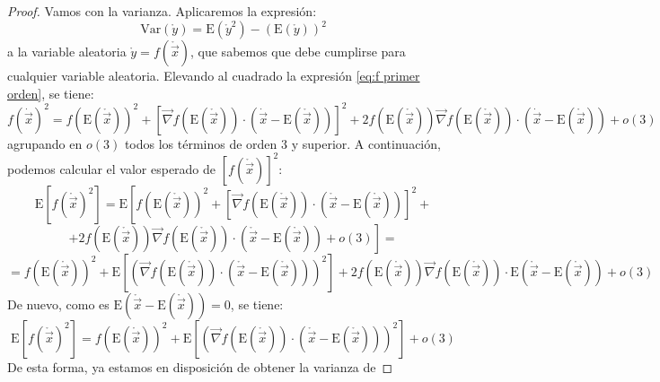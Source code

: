 \documentclass[11pt,a4paper,spanish]{article}
\numberwithin{equation}{section}
\numberwithin{table}{section}
\numberwithin{figure}{section}
\theoremstyle{definition}
\theoremstyle{remark}
\theoremstyle{definition}
\theoremstyle{remark}
\theoremstyle{plain}
\theoremstyle{plain}
\theoremstyle{plain}
\theoremstyle{plain}
\theoremstyle{plain}
\theoremstyle{plain}
\begin{document}
\begin{proof}
		Vamos con la varianza. Aplicaremos la expresión:
		\[
		\mathrm{Var}\left(\mathring{y}\right)=\mathrm{E}\left(\mathring{y}^{2}\right)-\left(\mathrm{E}\left(\mathring{y}\right)\right)^{2}
		\]
		a la variable aleatoria $\mathring{y}=f\left(\mathring{\vec{x}}\right)$,
		que sabemos que debe cumplirse para cualquier variable aleatoria.
		Elevando al cuadrado la expresión \vref{eq:f primer orden}, se tiene:
		\[
		f\left(\dot{\vec{x}}\right)^{2}=f\left(\mathrm{E}\left(\mathring{\vec{x}}\right)\right)^{2}+\left[\vec{\nabla}f\left(\mathrm{E}\left(\mathring{\vec{x}}\right)\right)\cdot\left(\dot{\vec{x}}-\mathrm{E}\left(\mathring{\vec{x}}\right)\right)\right]^{2}+2f\left(\mathrm{E}\left(\mathring{\vec{x}}\right)\right)\vec{\nabla}f\left(\mathrm{E}\left(\mathring{\vec{x}}\right)\right)\cdot\left(\dot{\vec{x}}-\mathrm{E}\left(\mathring{\vec{x}}\right)\right)+o\left(3\right)
		\]
		agrupando en $o\left(3\right)$ todos los términos de orden $3$ y
		superior. A continuación, podemos calcular el valor esperado de $\left[f\left(\mathring{\vec{x}}\right)\right]^{2}$:
		\[
		\mathrm{E}\left[f\left(\mathring{\vec{x}}\right)^{2}\right]=\mathrm{E}\left[f\left(\mathrm{E}\left(\mathring{\vec{x}}\right)\right)^{2}+\left[\vec{\nabla}f\left(\mathrm{E}\left(\mathring{\vec{x}}\right)\right)\cdot\left(\mathring{\vec{x}}-\mathrm{E}\left(\mathring{\vec{x}}\right)\right)\right]^{2}+\right.
		\]
		\[
		\left.+2f\left(\mathrm{E}\left(\mathring{\vec{x}}\right)\right)\vec{\nabla}f\left(\mathrm{E}\left(\mathring{\vec{x}}\right)\right)\cdot\left(\mathring{\vec{x}}-\mathrm{E}\left(\mathring{\vec{x}}\right)\right)+o\left(3\right)\right]=
		\]
		\[
		=f\left(\mathrm{E}\left(\mathring{\vec{x}}\right)\right)^{2}+\mathrm{E}\left[\left(\vec{\nabla}f\left(\mathrm{E}\left(\mathring{\vec{x}}\right)\right)\cdot\left(\mathring{\vec{x}}-\mathrm{E}\left(\mathring{\vec{x}}\right)\right)\right)^{2}\right]+2f\left(\mathrm{E}\left(\mathring{\vec{x}}\right)\right)\vec{\nabla}f\left(\mathrm{E}\left(\mathring{\vec{x}}\right)\right)\cdot\mathrm{E}\left(\mathring{\vec{x}}-\mathrm{E}\left(\mathring{\vec{x}}\right)\right)+o\left(3\right)
		\]
		De nuevo, como es $\mathrm{E}\left(\mathring{\vec{x}}-\mathrm{E}\left(\mathring{\vec{x}}\right)\right)=0$,
		se tiene:
		\[
		\mathrm{E}\left[f\left(\mathring{\vec{x}}\right)^{2}\right]=f\left(\mathrm{E}\left(\mathring{\vec{x}}\right)\right)^{2}+\mathrm{E}\left[\left(\vec{\nabla}f\left(\mathrm{E}\left(\mathring{\vec{x}}\right)\right)\cdot\left(\mathring{\vec{x}}-\mathrm{E}\left(\mathring{\vec{x}}\right)\right)\right)^{2}\right]+o\left(3\right)
		\]
		De esta forma, ya estamos en disposición de obtener la varianza de

\end{proof}
\end{document}
